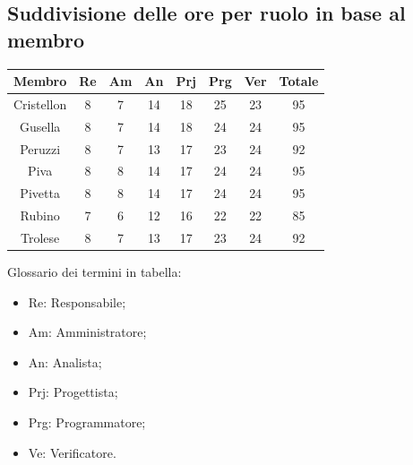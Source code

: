 \documentclass[10pt]{article}
\begin{document}
\subsection{Suddivisione delle ore per ruolo in base al membro}
\begin{center}
\begin{tabular}{|c|c|c|c|c|c|c|c|}
\hline
\textbf{Membro} & \textbf{Re} & \textbf{Am} & \textbf{An} & \textbf{Prj} & \textbf{Prg} & \textbf{Ver} & \textbf{Totale}\\
\hline
Cristellon & 8 & 7 & 14 & 18 & 25 & 23 & 95\\
Gusella    & 8 & 7 & 14 & 18 & 24 & 24 & 95\\
Peruzzi    & 8 & 7 & 13 & 17 & 23 & 24 & 92\\
Piva       & 8 & 8 & 14 & 17 & 24 & 24 & 95\\
Pivetta    & 8 & 8 & 14 & 17 & 24 & 24 & 95\\
Rubino     & 7 & 6 & 12 & 16 & 22 & 22 & 85\\
Trolese    & 8 & 7 & 13 & 17 & 23 & 24 & 92\\
\hline
\end{tabular}
\end{center}
Glossario dei termini in tabella:
\begin{itemize}
\item Re: Responsabile;
\item Am: Amministratore;
\item An: Analista;
\item Prj: Progettista;
\item Prg: Programmatore;
\item Ve: Verificatore.
\end{itemize}
\end{document}
